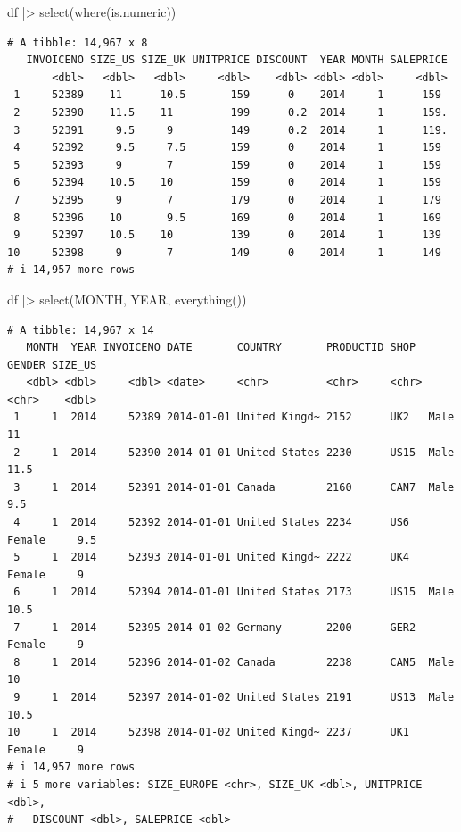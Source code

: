 \documentclass[
  letterpaper,
  DIV=11,
  numbers=noendperiod]{scrreprt}
\newenvironment{Shaded}{\begin{snugshade}}{\end{snugshade}}
\newcommand{\FunctionTok}[1]{\textcolor[rgb]{0.28,0.35,0.67}{#1}}
\newcommand{\NormalTok}[1]{\textcolor[rgb]{0.00,0.23,0.31}{#1}}
\newcommand{\SpecialCharTok}[1]{\textcolor[rgb]{0.37,0.37,0.37}{#1}}
\begin{document}
\begin{Shaded}
\begin{Highlighting}[]
\NormalTok{df }\SpecialCharTok{|\textgreater{}}
    \FunctionTok{select}\NormalTok{(}\FunctionTok{where}\NormalTok{(is.numeric))}
\end{Highlighting}
\end{Shaded}

\begin{verbatim}
# A tibble: 14,967 x 8
   INVOICENO SIZE_US SIZE_UK UNITPRICE DISCOUNT  YEAR MONTH SALEPRICE
       <dbl>   <dbl>   <dbl>     <dbl>    <dbl> <dbl> <dbl>     <dbl>
 1     52389    11      10.5       159      0    2014     1      159 
 2     52390    11.5    11         199      0.2  2014     1      159.
 3     52391     9.5     9         149      0.2  2014     1      119.
 4     52392     9.5     7.5       159      0    2014     1      159 
 5     52393     9       7         159      0    2014     1      159 
 6     52394    10.5    10         159      0    2014     1      159 
 7     52395     9       7         179      0    2014     1      179 
 8     52396    10       9.5       169      0    2014     1      169 
 9     52397    10.5    10         139      0    2014     1      139 
10     52398     9       7         149      0    2014     1      149 
# i 14,957 more rows
\end{verbatim}

\begin{Shaded}
\begin{Highlighting}[]
\NormalTok{df }\SpecialCharTok{|\textgreater{}}
    \FunctionTok{select}\NormalTok{(MONTH, YEAR, }\FunctionTok{everything}\NormalTok{())}
\end{Highlighting}
\end{Shaded}

\begin{verbatim}
# A tibble: 14,967 x 14
   MONTH  YEAR INVOICENO DATE       COUNTRY       PRODUCTID SHOP  GENDER SIZE_US
   <dbl> <dbl>     <dbl> <date>     <chr>         <chr>     <chr> <chr>    <dbl>
 1     1  2014     52389 2014-01-01 United Kingd~ 2152      UK2   Male      11  
 2     1  2014     52390 2014-01-01 United States 2230      US15  Male      11.5
 3     1  2014     52391 2014-01-01 Canada        2160      CAN7  Male       9.5
 4     1  2014     52392 2014-01-01 United States 2234      US6   Female     9.5
 5     1  2014     52393 2014-01-01 United Kingd~ 2222      UK4   Female     9  
 6     1  2014     52394 2014-01-01 United States 2173      US15  Male      10.5
 7     1  2014     52395 2014-01-02 Germany       2200      GER2  Female     9  
 8     1  2014     52396 2014-01-02 Canada        2238      CAN5  Male      10  
 9     1  2014     52397 2014-01-02 United States 2191      US13  Male      10.5
10     1  2014     52398 2014-01-02 United Kingd~ 2237      UK1   Female     9  
# i 14,957 more rows
# i 5 more variables: SIZE_EUROPE <chr>, SIZE_UK <dbl>, UNITPRICE <dbl>,
#   DISCOUNT <dbl>, SALEPRICE <dbl>
\end{verbatim}
\end{document}
